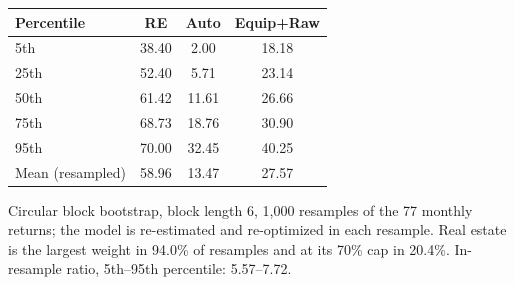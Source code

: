 \begin{tabular}{lccc}
\toprule
\textbf{Percentile} & RE & Auto & Equip+Raw \\
\midrule
5th & 38.40 & 2.00 & 18.18 \\
25th & 52.40 & 5.71 & 23.14 \\
50th & 61.42 & 11.61 & 26.66 \\
75th & 68.73 & 18.76 & 30.90 \\
95th & 70.00 & 32.45 & 40.25 \\
Mean (resampled) & 58.96 & 13.47 & 27.57 \\
\bottomrule
\end{tabular}
\par\smallskip\parbox{\linewidth}{\footnotesize Circular block bootstrap, block length 6, 1,000 resamples of the 77 monthly returns; the model is re-estimated and re-optimized in each resample. Real estate is the largest weight in 94.0\% of resamples and at its 70\% cap in 20.4\%. In-resample ratio, 5th--95th percentile: 5.57--7.72.}
